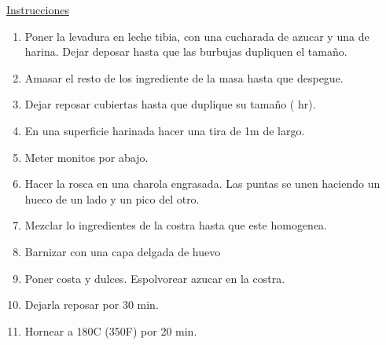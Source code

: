 \underline{Instrucciones}
\begin{enumerate}
\item Poner la levadura en leche tibia, con una cucharada de azucar y una de harina. Dejar deposar hasta que las burbujas dupliquen el tamaño.
\item Amasar el resto de los ingrediente de la masa hasta que despegue.
\item Dejar reposar cubiertas hasta que duplique su tamaño ( hr).
\item En una superficie harinada hacer una tira de 1m de largo.
\item Meter monitos por abajo.
\item Hacer la rosca en una charola engrasada. Las puntas se unen haciendo un hueco de un lado y un pico del otro.
\item Mezclar lo ingredientes de la costra hasta que este homogenea.
\item Barnizar con una capa delgada de huevo
\item Poner costa y dulces. Espolvorear azucar en la costra.
\item Dejarla reposar por 30 min.
\item Hornear a 180C (350F) por 20 min.
\end{enumerate}
